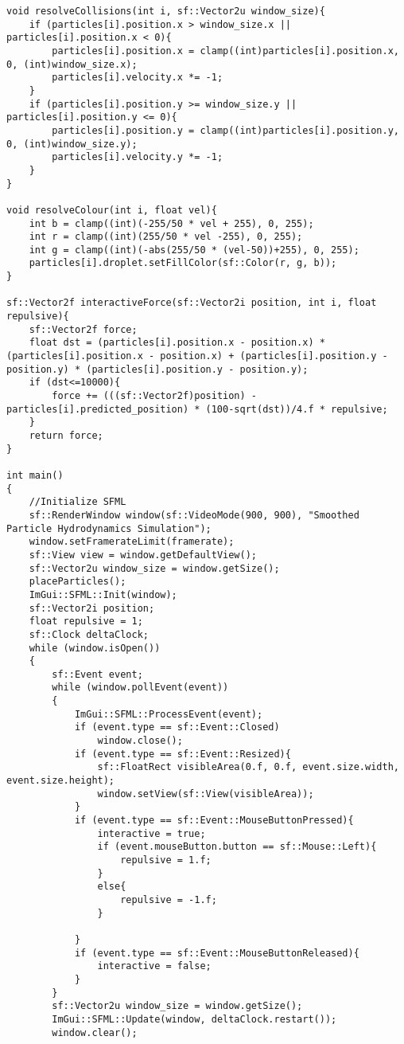 \documentclass[write-up.tex]{subfiles}
\begin{document}
\begin{appendices}
\begin{lstlisting}
void resolveCollisions(int i, sf::Vector2u window_size){
    if (particles[i].position.x > window_size.x || particles[i].position.x < 0){
        particles[i].position.x = clamp((int)particles[i].position.x, 0, (int)window_size.x);
        particles[i].velocity.x *= -1;
    }
    if (particles[i].position.y >= window_size.y || particles[i].position.y <= 0){
        particles[i].position.y = clamp((int)particles[i].position.y, 0, (int)window_size.y);
        particles[i].velocity.y *= -1;
    }
}

void resolveColour(int i, float vel){
    int b = clamp((int)(-255/50 * vel + 255), 0, 255);
    int r = clamp((int)(255/50 * vel -255), 0, 255);
    int g = clamp((int)(-abs(255/50 * (vel-50))+255), 0, 255);
    particles[i].droplet.setFillColor(sf::Color(r, g, b));
}

sf::Vector2f interactiveForce(sf::Vector2i position, int i, float repulsive){
    sf::Vector2f force;
    float dst = (particles[i].position.x - position.x) * (particles[i].position.x - position.x) + (particles[i].position.y - position.y) * (particles[i].position.y - position.y);
    if (dst<=10000){
        force += (((sf::Vector2f)position) - particles[i].predicted_position) * (100-sqrt(dst))/4.f * repulsive;
    }
    return force;
}

int main()
{
    //Initialize SFML
    sf::RenderWindow window(sf::VideoMode(900, 900), "Smoothed Particle Hydrodynamics Simulation");
    window.setFramerateLimit(framerate);
    sf::View view = window.getDefaultView();
    sf::Vector2u window_size = window.getSize();
    placeParticles();
    ImGui::SFML::Init(window);
    sf::Vector2i position;
    float repulsive = 1;
    sf::Clock deltaClock;
    while (window.isOpen())
    {
        sf::Event event;
        while (window.pollEvent(event))
        {
            ImGui::SFML::ProcessEvent(event);
            if (event.type == sf::Event::Closed)
                window.close();
            if (event.type == sf::Event::Resized){
                sf::FloatRect visibleArea(0.f, 0.f, event.size.width, event.size.height);
                window.setView(sf::View(visibleArea));
            }
            if (event.type == sf::Event::MouseButtonPressed){
                interactive = true;
                if (event.mouseButton.button == sf::Mouse::Left){
                    repulsive = 1.f;
                }
                else{
                    repulsive = -1.f;
                }

            }
            if (event.type == sf::Event::MouseButtonReleased){
                interactive = false;
            }
        }
        sf::Vector2u window_size = window.getSize();
        ImGui::SFML::Update(window, deltaClock.restart());
        window.clear();


\end{lstlisting}
\end{appendices}
\end{document}
